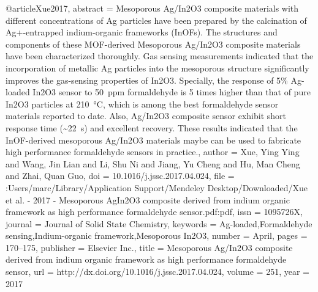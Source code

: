 @article{Xue2017,
abstract = {Mesoporous Ag/In2O3 composite materials with different concentrations of Ag particles have been prepared by the calcination of Ag+-entrapped indium-organic frameworks (InOFs). The structures and components of these MOF-derived Mesoporous Ag/In2O3 composite materials have been characterized thoroughly. Gas sensing measurements indicated that the incorporation of metallic Ag particles into the mesoporous structure significantly improves the gas-sensing properties of In2O3. Specially, the response of 5{\%} Ag-loaded In2O3 sensor to 50 ppm formaldehyde is 5 times higher than that of pure In2O3 particles at 210 °C, which is among the best formaldehyde sensor materials reported to date. Also, Ag/In2O3 composite sensor exhibit short response time ({\~{}}22 s) and excellent recovery. These results indicated that the InOF-derived mesoporous Ag/In2O3 materials maybe can be used to fabricate high performance formaldehyde sensors in practice.},
author = {Xue, Ying Ying and Wang, Jin Lian and Li, Shu Ni and Jiang, Yu Cheng and Hu, Man Cheng and Zhai, Quan Guo},
doi = {10.1016/j.jssc.2017.04.024},
file = {:Users/marc/Library/Application Support/Mendeley Desktop/Downloaded/Xue et al. - 2017 - Mesoporous AgIn2O3 composite derived from indium organic framework as high performance formaldehyde sensor.pdf:pdf},
issn = {1095726X},
journal = {Journal of Solid State Chemistry},
keywords = {Ag-loaded,Formaldehyde sensing,Indium-organic framework,Mesoporous In2O3},
number = {April},
pages = {170--175},
publisher = {Elsevier Inc.},
title = {{Mesoporous Ag/In2O3 composite derived from indium organic framework as high performance formaldehyde sensor}},
url = {http://dx.doi.org/10.1016/j.jssc.2017.04.024},
volume = {251},
year = {2017}
}
